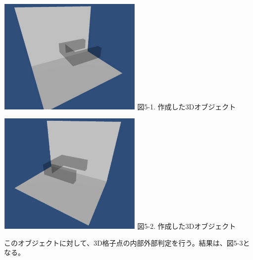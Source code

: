 \vspace{5mm}
\begin{minipage}{0.5\hsize}
  \begin{center}
   \includegraphics[width=70mm]{3d_obje_2.eps}
   図5-1. 作成した3Dオブジェクト
  \end{center}
  \label{fig:one}
 \end{minipage}
 \begin{minipage}{0.5\hsize}
  \begin{center}
   \includegraphics[width=70mm]{3d_obje_1.eps}
   図5-2. 作成した3Dオブジェクト
  \end{center}
  \label{fig:two}
 \end{minipage}

このオブジェクトに対して、3D格子点の内部外部判定を行う。結果は、図5-3となる。

